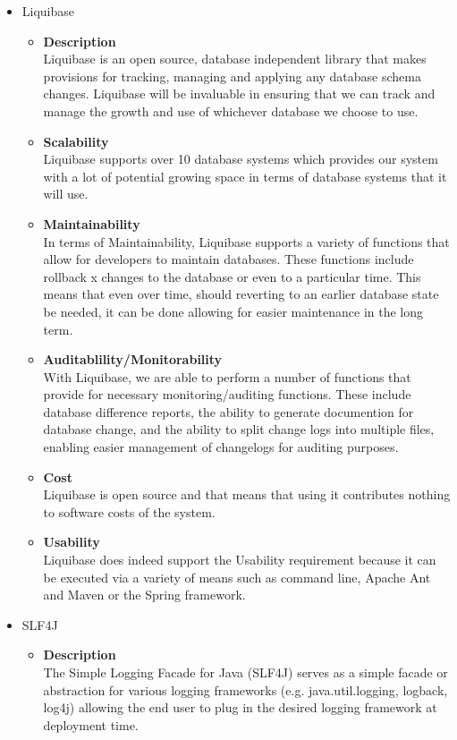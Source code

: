 \documentclass[a4paper,10pt]{article}
\begin{document}
\begin{itemize}
		\item Liquibase
			\begin{itemize}
				\item \textbf{Description}\\
				Liquibase is an open source, database independent library that makes provisions for tracking, managing and applying any database schema changes. Liquibase will be invaluable in ensuring that we can track and manage the growth and use of whichever database we choose to use.
				\item \textbf{Scalability}\\
				Liquibase supports over 10 database systems which provides our system with a lot of potential growing space in terms of database systems that it will use. 
				\item \textbf{Maintainability}\\
				In terms of Maintainability, Liquibase supports a variety of functions that allow for developers to maintain databases. These functions include rollback x changes to the database or even to a particular time. This means that even over time, should reverting to an earlier database state be needed, it can be done allowing for easier maintenance in the long term.
				\item \textbf{Auditablility/Monitorability}\\
				With Liquibase, we are able to perform a number of functions that provide for necessary monitoring/auditing functions. These include database difference reports, the ability to generate documention for database change, and the ability to split change logs into multiple files, enabling easier management of changelogs for auditing purposes.
				\item \textbf{Cost}\\
				Liquibase is open source and that means that using it contributes nothing to software costs of the system. 
				\item \textbf{Usability}\\
				Liquibase does indeed support the Usability requirement because it can be executed via a variety of means such as command line, Apache Ant and Maven or the Spring framework.
			\end{itemize}

		\item SLF4J
			\begin{itemize}
				\item \textbf{Description}\\
					The Simple Logging Facade for Java (SLF4J) serves as a simple facade or abstraction for various logging frameworks (e.g. java.util.logging, logback, log4j) allowing the end user to plug in the desired logging framework at deployment time. 
				

\end{itemize}
\end{itemize}
\end{document}
